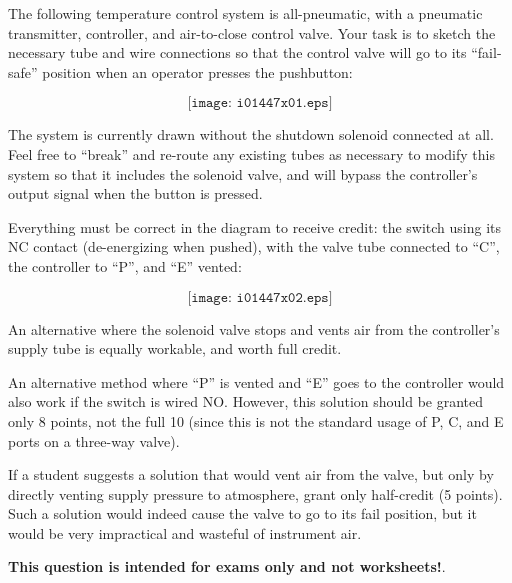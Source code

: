

The following temperature control system is all-pneumatic, with a pneumatic transmitter, controller, and air-to-close control valve.  Your task is to sketch the necessary tube and wire connections so that the control valve will go to its ``fail-safe'' position when an operator presses the pushbutton:

$$\texttt{[image: i01447x01.eps]}$$

The system is currently drawn without the shutdown solenoid connected at all.  Feel free to ``break'' and re-route any existing tubes as necessary to modify this system so that it includes the solenoid valve, and will bypass the controller's output signal when the button is pressed.
 






Everything must be correct in the diagram to receive credit: the switch using its NC contact (de-energizing when pushed), with the valve tube connected to ``C'', the controller to ``P'', and ``E'' vented:

$$\texttt{[image: i01447x02.eps]}$$

An alternative where the solenoid valve stops and vents air from the controller's supply tube is equally workable, and worth full credit.

An alternative method where ``P'' is vented and ``E'' goes to the controller would also work if the switch is wired NO.  However, this solution should be granted only 8 points, not the full 10 (since this is not the standard usage of P, C, and E ports on a three-way valve).

If a student suggests a solution that would vent air from the valve, but only by directly venting supply pressure to atmosphere, grant only half-credit (5 points).  Such a solution would indeed cause the valve to go to its fail position, but it would be very impractical and wasteful of instrument air. 







{\bf This question is intended for exams only and not worksheets!}.



